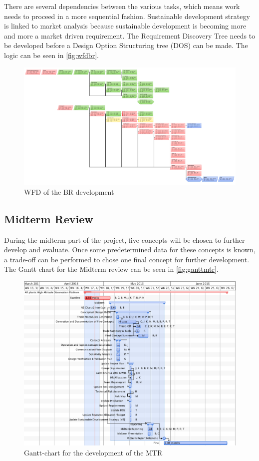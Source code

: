 \documentclass[a4paper]{report}
\begin{document}
There are several dependencies between the various tasks, which means work needs to proceed in a more sequential fashion. Sustainable development strategy is linked to market analysis because sustainable development is becoming more and more a market driven requirement. The Requirement Discovery Tree needs to be  developed before a Design Option Structuring tree (DOS) can be made. The logic can be seen in \autoref{fig:wfdbr}.
\begin{figure}[h]
	\centering
	
	\includegraphics[width=\textwidth]{Figures/BASEWFD.pdf}
	\caption{WFD of the BR development}
	\label{fig:wfdbr}
	
\end{figure}
\subsection{Midterm Review}
During the midterm part of the project, five concepts will be chosen to further develop and evaluate. Once some predetermined data for these concepts is known, a trade-off can be performed to chose one final concept for further development. The Gantt chart for the Midterm review can be seen in \autoref{fig:ganttmtr}. 

\begin{figure}[h]
	\centering
	
	\includegraphics[width=\textheight, angle=270]{Figures/MIDGANTT.PDF}
	\caption{Gantt-chart for the development of the MTR}
	\label{fig:ganttmtr}
	
\end{figure}
\end{document}
